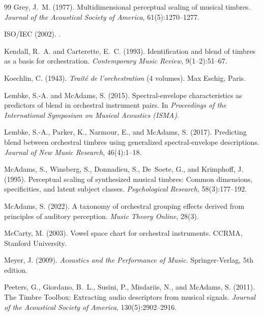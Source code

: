 \documentclass[12pt,a4paper]{article}
\begin{document}
\begin{thebibliography}{99}
Grey, J.~M. (1977).
\newblock Multidimensional perceptual scaling of musical timbres.
\newblock \emph{Journal of the Acoustical Society of America}, 61(5):1270--1277.

{ISO/IEC} (2002).
.

Kendall, R.~A. and Carterette, E.~C. (1993).
\newblock Identification and blend of timbres as a basis for orchestration.
\newblock \emph{Contemporary Music Review}, 9(1--2):51--67.

Koechlin, C. (1943).
\newblock \emph{Trait\'e de l'orchestration} (4 volumes).
\newblock Max Eschig, Paris.

Lembke, S.-A. and McAdams, S. (2015).
\newblock Spectral-envelope characteristics as predictors of blend in
  orchestral instrument pairs.
\newblock In \emph{Proceedings of the International Symposium on Musical
  Acoustics (ISMA)}.

Lembke, S.-A., Parker, K., Narmour, E., and McAdams, S. (2017).
\newblock Predicting blend between orchestral timbres using generalized
  spectral-envelope descriptions.
\newblock \emph{Journal of New Music Research}, 46(4):1--18.

McAdams, S., Winsberg, S., Donnadieu, S., De~Soete, G., and Krimphoff, J.
  (1995).
\newblock Perceptual scaling of synthesized musical timbres: Common dimensions,
  specificities, and latent subject classes.
\newblock \emph{Psychological Research}, 58(3):177--192.

McAdams, S. (2022).
\newblock A taxonomy of orchestral grouping effects derived from principles of
  auditory perception.
\newblock \emph{Music Theory Online}, 28(3).

McCarty, M. (2003).
\newblock Vowel space chart for orchestral instruments.
\newblock CCRMA, Stanford University.

Meyer, J. (2009).
\newblock \emph{Acoustics and the Performance of Music}.
\newblock Springer-Verlag, 5th edition.

Peeters, G., Giordano, B.~L., Susini, P., Misdariis, N., and McAdams, S.
  (2011).
\newblock The {T}imbre {T}oolbox: Extracting audio descriptors from musical
  signals.
\newblock \emph{Journal of the Acoustical Society of America},
  130(5):2902--2916.


\end{thebibliography}
\end{document}
